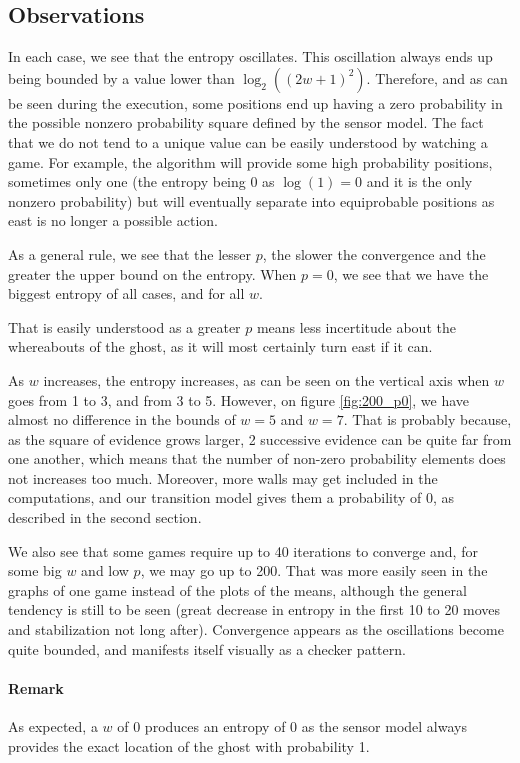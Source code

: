 \documentclass[a4paper, 12pt]{article}
\begin{document}
    \subsection{Observations}
    In each case, we see that the entropy oscillates. This oscillation always ends up being bounded by a value lower than \(\log_2((2w+1)^2)\). Therefore, and as can be seen during the execution, some positions end up having a zero probability in the possible nonzero probability square defined by the sensor model. The fact that we do not tend to a unique value can be easily understood by watching a game. For example, the algorithm will provide some high probability positions, sometimes only one (the entropy being \num{0} as \(\log(1) = 0\) and it is the only nonzero probability) but will eventually separate into equiprobable positions as east is no longer a possible action.\par 
    As a general rule, we see that  the lesser \(p\), the slower the convergence and the greater the upper bound on the entropy. When \(p = 0\), we see that we have the biggest entropy of all cases, and for all \(w\).\par
    That is easily understood as a greater \(p\) means less incertitude about the whereabouts of the ghost, as it will most certainly turn east if it can.\par 
    As \(w\) increases, the entropy increases, as can be seen on the vertical axis when \(w\) goes from \num{1} to \num{3}, and from \num{3} to \num{5}. However, on figure \ref{fig:200_p0}, we have almost no difference in the bounds of \(w = 5\) and \(w = 7\). That is probably because, as the square of evidence grows larger, \num{2} successive evidence can be quite far from one another, which means that the number of non-zero probability elements does not increases too much. Moreover, more walls may get included in the computations, and our transition model gives them a probability of \num{0}, as described in the second section.\par
    We also see that some games require up to \num{40} iterations to converge and, for some big \(w\) and low \(p\), we may go up to \num{200}. That was more easily seen in the graphs of one game instead of the plots of the means, although the general tendency is still to be seen (great decrease in entropy in the first \num{10} to \num{20} moves and stabilization not long after). Convergence appears as the oscillations become quite bounded, and manifests itself visually as a checker pattern.
    \paragraph{Remark} As expected, a \(w\) of \num{0} produces an entropy of \num{0} as the sensor model always provides the exact location of the ghost with probability \num{1}.
    
\end{document}
